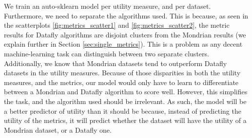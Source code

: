 We train an auto-sklearn model per utility measure, and per dataset. Furthermore, we need to separate the algorithms used. This is because, as seen in the scatterplots \ref{fig:metrics_scatter1} and \ref{fig:metrics_scatter2}, the metric results for Datafly algorithms are disjoint clusters from the Mondrian results (we explain further in Section \ref{sec:single_metrics}). This is a problem as any decent machine-learning task can distinguish between two separate clusters. Additionally, we know that Mondrian datasets tend to outperform Datafly datasets in the utility measures. Because of those disparities in both the utility measures, and the metrics, our model would only have to learn to differentiate between a Mondrian and Datafly algorithm to score well. However, this simplifies the task, and the algorithm used should be irrelevant. As such, the model will be a better predictor of utility than it should be because, instead of predicting the utility of the metrics, it will predict whether the dataset will have the utility of a Mondrian dataset, or a Datafly one.






